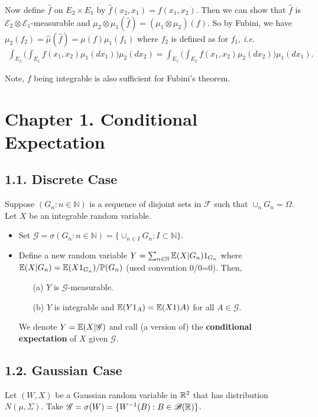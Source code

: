 \documentclass[12pt,a4paper]{report}
\begin{document}
Now define $\hat{f}$ on $E_2 \times E_1$ by $\hat{f}(x_2,x_1) = f(x_1,x_2)$. Then we can show that $\hat{f}$ is $\mathscr{E}_2 \otimes \mathscr{E}_1$-measurable and $\mu_2 \otimes \mu_1 (\hat{f}) = (\mu_1 \otimes \mu_2)(f)$. So by Fubini, we have $\mu_2(f_2) = \hat{\mu}(\hat{f}) = \mu(f) \mu_1(f_1)$ where $f_2$ is defined as for $f_1$, \textit{i.e.}
\begin{align*}
\int_{E_2} \big( \int_{E_1} f(x_1, x_2) \mu_1(dx_1) \big) \mu_2(dx_2) = \int_{E_1} \big( \int_{E_2} f(x_1, x_2) \mu_2(dx_2) \big) \mu_1(dx_1).
\end{align*}
\s

Note, $f$ being integrable is also sufficient for Fubini's theorem.
\s

\section*{Chapter 1. Conditional Expectation}
\subsection*{1.1. Discrete Case}

Suppose $(G_n : n\in \mathbb{N})$ is a sequence of disjoint sets in $\mathscr{F}$ such that $\cup_n G_n = \Omega$. Let $X$ be an integrable random variable.
\begin{itemize}
\item Set $\mathscr{G} = \sigma(G_n : n\in \mathbb{N}) = \{ \cup_{n\in I}G_n : I \subset \mathbb{N} \}$.

\item Define a new random variable $Y = \sum_{n \in \mathbb{N}} \mathbb{E}(X | G_n ) 1_{G_n}$ where $\mathbb{E}(X|G_n) =  \mathbb{E}(X 1_{G_n}) / \mathbb{P}(G_n)$ (used convention 0/0=0). Then,
\begin{itemize}
\item[(a)] $Y$ is $\mathscr{G}$-measurable.
\item[(b)] $Y$ is integrable and $\mathbb{E}(Y 1_A) = \mathbb{E}(X 1)A)$ for all $A \in \mathscr{G}$.
\end{itemize} 
We denote $Y = \mathbb{E}(X|\mathscr{G})$ and call (a version of) the \textbf{conditional expectation} of $X$ given $\mathscr{G}$. 
\end{itemize}
\s

\subsection*{1.2. Gaussian Case}

Let $(W,X)$ be a Gaussian random variable in $\mathbb{R}^2$ that has distribution $N(\mu, \Sigma)$. Take $\mathscr{G} = \sigma(W) = \{ W^{-1}(B) : B \in \mathscr{B}(\mathbb{R}) \}$. 
\s
\end{document}
